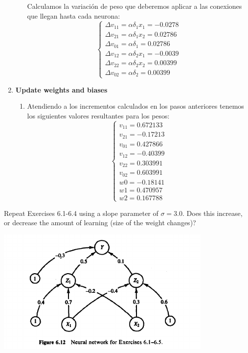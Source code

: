 \begin{problem}[4]
\begin{enumerate}
\begin{enumerate}
Calculamos la variación de peso que deberemos aplicar a las conexiones que llegan hasta cada neurona:
\[\left\{ \begin{array}{l}
Δv_{11}= αδ_1x_1 = -0.0278 \\
Δv_{21}= αδ_1x_2 = 0.02786 \\
Δv_{01}= αδ_1    = 0.02786 \\
Δv_{12}= αδ_2x_1 = -0.0039 \\
Δv_{22}= αδ_2x_2 = 0.00399 \\
Δv_{02}= αδ_2    = 0.00399
\end{array}\right.\]

\end{enumerate}
\item \textbf{Update weights and biases}
\begin{enumerate}
\item Atendiendo a los incrementos calculados en los pasos anteriores tenemos los siguientes valores resultantes para los pesos:
\[\left\{ \begin{array}{l}
v_{11} =  0.672133\\
v_{21} =  -0.17213\\
v_{01} =  0.427866\\
v_{12} =  -0.40399\\
v_{22} =  0.303991\\
v_{02} =  0.603991\\
w0     =  -0.18141\\
w1     =  0.470957\\
w2     =  0.167788
\end{array}\right.\]
\end{enumerate}
\end{enumerate}

\end{problem}

\begin{problem}[5]
Repeat Exercises 6.1-6.4 using a slope parameter of $σ = 3.0$. Does this increase, or decrease the amount of learning (size of the weight changes)?

\solution
\end{problem}

\begin{center}
\includegraphics[width=0.8\textwidth]{img/figure6-12.png}
\end{center}

